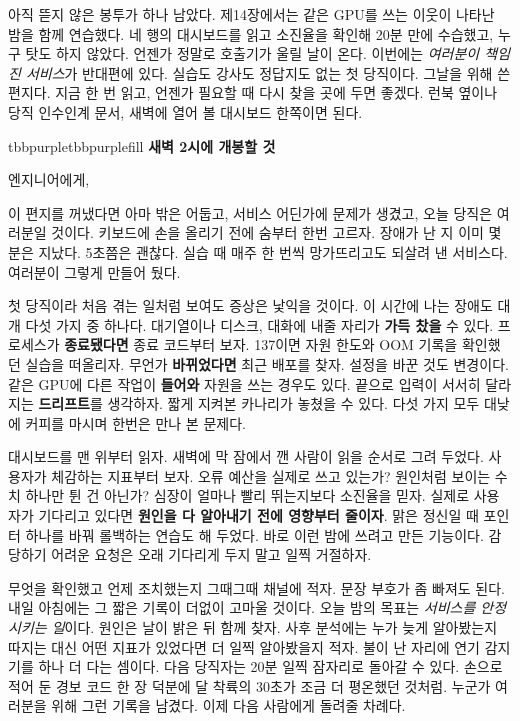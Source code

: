 \vspace{4.0pt}


아직 뜯지 않은 봉투가 하나 남았다. 제14장에서는 같은 GPU를 쓰는 이웃이 나타난 밤을 함께 연습했다. 네 행의 대시보드를 읽고 소진율을 확인해 20분 만에 수습했고, 누구 탓도 하지 않았다. 언젠가 정말로 호출기가 울릴 날이 온다. 이번에는 \textit{여러분이 책임진 서비스}가 반대편에 있다. 실습도 강사도 정답지도 없는 첫 당직이다. 그날을 위해 쓴 편지다. 지금 한 번 읽고, 언젠가 필요할 때 다시 찾을 곳에 두면 좋겠다. 런북 옆이나 당직 인수인계 문서, 새벽에 열어 볼 대시보드 한쪽이면 된다.

\begin{calloutbox}{tbbpurple}{tbbpurplefill}
{\normalsize\bfseries\color{tbbpurple}새벽 2시에 개봉할 것}\par\vspace{3pt}
엔지니어에게,

이 편지를 꺼냈다면 아마 밖은 어둡고, 서비스 어딘가에 문제가 생겼고, 오늘 당직은 여러분일 것이다. 키보드에 손을 올리기 전에 숨부터 한번 고르자. 장애가 난 지 이미 몇 분은 지났다. 5초쯤은 괜찮다. 실습 때 매주 한 번씩 망가뜨리고도 되살려 낸 서비스다. 여러분이 그렇게 만들어 뒀다.

첫 당직이라 처음 겪는 일처럼 보여도 증상은 낯익을 것이다. 이 시간에 나는 장애도 대개 다섯 가지 중 하나다. 대기열이나 디스크, 대화에 내줄 자리가 \textbf{가득 찼을} 수 있다. 프로세스가 \textbf{종료됐다면} 종료 코드부터 보자. 137이면 자원 한도와 OOM 기록을 확인했던 실습을 떠올리자. 무언가 \textbf{바뀌었다면} 최근 배포를 찾자. 설정을 바꾼 것도 변경이다. 같은 GPU에 다른 작업이 \textbf{들어와} 자원을 쓰는 경우도 있다. 끝으로 입력이 서서히 달라지는 \textbf{드리프트}를 생각하자. 짧게 지켜본 카나리가 놓쳤을 수 있다. 다섯 가지 모두 대낮에 커피를 마시며 한번은 만나 본 문제다.

대시보드를 맨 위부터 읽자. 새벽에 막 잠에서 깬 사람이 읽을 순서로 그려 두었다. 사용자가 체감하는 지표부터 보자. 오류 예산을 실제로 쓰고 있는가? 원인처럼 보이는 수치 하나만 튄 건 아닌가? 심장이 얼마나 빨리 뛰는지보다 소진율을 믿자. 실제로 사용자가 기다리고 있다면 \textbf{원인을 다 알아내기 전에 영향부터 줄이자}. 맑은 정신일 때 포인터 하나를 바꿔 롤백하는 연습도 해 두었다. 바로 이런 밤에 쓰려고 만든 기능이다. 감당하기 어려운 요청은 오래 기다리게 두지 말고 일찍 거절하자.

무엇을 확인했고 언제 조치했는지 그때그때 채널에 적자. 문장 부호가 좀 빠져도 된다. 내일 아침에는 그 짧은 기록이 더없이 고마울 것이다. 오늘 밤의 목표는 \textit{서비스를 안정시키는 일}이다. 원인은 날이 밝은 뒤 함께 찾자. 사후 분석에는 누가 늦게 알아봤는지 따지는 대신 어떤 지표가 있었다면 더 일찍 알아봤을지 적자. 불이 난 자리에 연기 감지기를 하나 더 다는 셈이다. 다음 당직자는 20분 일찍 잠자리로 돌아갈 수 있다. 손으로 적어 둔 경보 코드 한 장 덕분에 달 착륙의 30초가 조금 더 평온했던 것처럼. 누군가 여러분을 위해 그런 기록을 남겼다. 이제 다음 사람에게 돌려줄 차례다.


\end{calloutbox}
